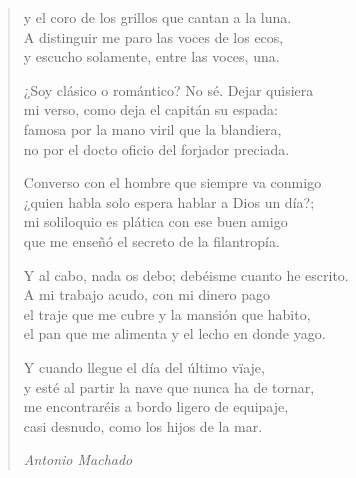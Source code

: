 \begin{verse}
\begin{center}
y el coro de los grillos que cantan a la luna. \\


A distinguir me paro las voces de los ecos, \\


y escucho solamente, entre las voces, una.

\par

¿Soy clásico o romántico? No sé. Dejar quisiera \\


mi verso, como deja el capitán su espada: \\


famosa por la mano viril que la blandiera, \\


no por el docto oficio del forjador preciada.

\par

Converso con el hombre que siempre va conmigo \\


¿quien habla solo espera hablar a Dios un día?; \\


mi soliloquio es plática con ese buen amigo \\


que me enseñó el secreto de la filantropía.

\par

Y al cabo, nada os debo; debéisme cuanto he escrito. \\


A mi trabajo acudo, con mi dinero pago \\


el traje que me cubre y la mansión que habito, \\


el pan que me alimenta y el lecho en donde yago.

\par

Y cuando llegue el día del último vïaje, \\


y esté al partir la nave que nunca ha de tornar, \\


me encontraréis a bordo ligero de equipaje, \\


casi desnudo, como los hijos de la mar.

\par{\it Antonio Machado}

\end{center}

\end{verse}      